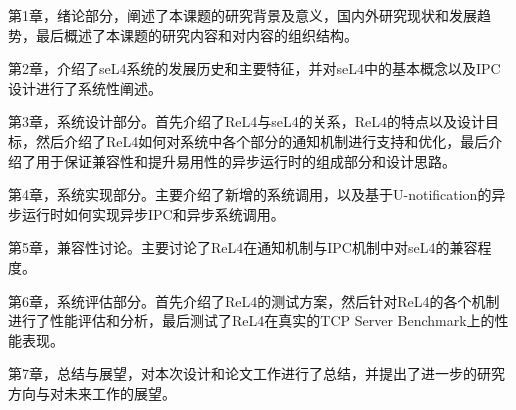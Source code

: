 第1章，绪论部分，阐述了本课题的研究背景及意义，国内外研究现状和发展趋势，最后概述了本课题的研究内容和对内容的组织结构。

第2章，介绍了seL4系统的发展历史和主要特征，并对seL4中的基本概念以及IPC设计进行了系统性阐述。

第3章，系统设计部分。首先介绍了ReL4与seL4的关系，ReL4的特点以及设计目标，然后介绍了ReL4如何对系统中各个部分的通知机制进行支持和优化，最后介绍了用于保证兼容性和提升易用性的异步运行时的组成部分和设计思路。

第4章，系统实现部分。主要介绍了新增的系统调用，以及基于U-notification的异步运行时如何实现异步IPC和异步系统调用。

第5章，兼容性讨论。主要讨论了ReL4在通知机制与IPC机制中对seL4的兼容程度。

第6章，系统评估部分。首先介绍了ReL4的测试方案，然后针对ReL4的各个机制进行了性能评估和分析，最后测试了ReL4在真实的TCP Server Benchmark上的性能表现。

第7章，总结与展望，对本次设计和论文工作进行了总结，并提出了进一步的研究方向与对未来工作的展望。